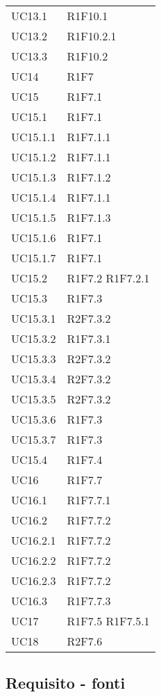 {\begin{longtable}{C{4cm} C{11.5cm}}
UC13.1 & R1F10.1 \\
UC13.2 & R1F10.2.1 \\
UC13.3 & R1F10.2 \\

UC14 & R1F7 \\

UC15 & R1F7.1 \\
UC15.1 & R1F7.1 \\
UC15.1.1 & R1F7.1.1 \\
UC15.1.2 & R1F7.1.1 \\
UC15.1.3 & R1F7.1.2 \\
UC15.1.4 & R1F7.1.1 \\
UC15.1.5 & R1F7.1.3 \\
UC15.1.6 & R1F7.1 \\
UC15.1.7 & R1F7.1 \\
UC15.2 & R1F7.2 \quad R1F7.2.1 \\
UC15.3 & R1F7.3 \\
UC15.3.1 & R2F7.3.2 \\
UC15.3.2 & R1F7.3.1 \\
UC15.3.3 & R2F7.3.2 \\
UC15.3.4 & R2F7.3.2 \\
UC15.3.5 & R2F7.3.2 \\
UC15.3.6 & R1F7.3 \\
UC15.3.7 & R1F7.3 \\
UC15.4 & R1F7.4 \\
UC16 & R1F7.7 \\
UC16.1 & R1F7.7.1 \\
UC16.2 & R1F7.7.2 \\
UC16.2.1 & R1F7.7.2 \\
UC16.2.2 & R1F7.7.2 \\
UC16.2.3 & R1F7.7.2 \\
UC16.3 & R1F7.7.3 \\
UC17 & R1F7.5 \quad R1F7.5.1\\
UC18 & R2F7.6 \\


\end{longtable}

}

\subsection{Requisito - fonti}


